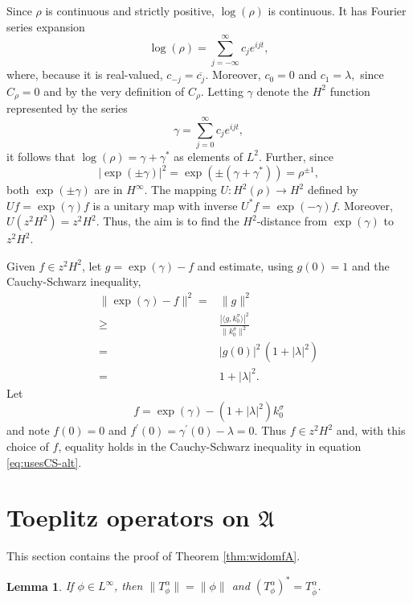 \documentclass[12pt]{amsart}
\newtheorem{lemma}[theorem]{Lemma}
\theoremstyle{definition}
\theoremstyle{remark}
\numberwithin{equation}{section}
\begin{document}
Since ${\rho}$ is continuous and strictly positive, $\log({\rho})$ is continuous. It has Fourier series expansion
\[
 \log({\rho}) = \sum_{j=-\infty}^\infty c_j  e^{ijt},
\]
where, because it is real-valued, $c_{-j}=\overline{c_j}.$ 
Moreover, $c_0=0$
and $c_1=\lambda,$ since ${C_{\rho}}=0$ and by the very definition of ${C_{\rho}}$. Letting ${\gamma}$ denote the $H^2$ function represented
by the series
\[
 {\gamma} = \sum_{j=0}^\infty c_j e^{ijt},
\]
it follows that $\log({\rho}) = {\gamma} +{\gamma}^*$ as elements of $L^2$.
Further, since
\[
 |\exp(\pm {\gamma})|^2 = \exp\left(\pm ({\gamma}+{\gamma}^*)\right) = {\rho}^{\pm 1},
\]
both $\exp(\pm {\gamma})$ are in $H^\infty$.
The mapping $U:H^2(\rho)\to H^2$ defined by $Uf=\exp({\gamma}) f$ is a unitary map
with inverse $U^*f=\exp(-{\gamma}) f$. Moreover, $U(z^2H^2)=z^2 H^2$. 
Thus, the aim is to find the $H^2$-distance from $\exp({\gamma})$ to $z^2H^2$. 

Given $f\in z^2 H^2$, let $g=\exp({\gamma})-f$ and estimate, using $g(0)=1$ and the Cauchy-Schwarz inequality,
\begin{equation}
\label{eq:usesCS-alt}
 \begin{split}
  \|\exp({\gamma})-f\|^2 
     =  & \|g\|^2 \\
      \ge & \frac{ |\langle g, k^{\sigma}_0 \rangle|^2}{ \|k^{\sigma}_0\|^2} \\
   = & |g(0)|^2\, (1+|\lambda|^2) \\
   = & 1+|\lambda|^2.
 \end{split}
\end{equation}
Let 
\[
 f= \exp({\gamma})- (1+|\lambda|^2)k_0^{\sigma}
\]
and note $f(0)=0$ and $f^\prime(0)={\gamma}^\prime(0)-\lambda=0$. Thus $f\in z^2 H^2$ and, with this choice of 
$f$, equality holds in the Cauchy-Schwarz inequality in equation \eqref{eq:usesCS-alt}.

\section{Toeplitz operators on ${\mathfrak{A}}$}
This section contains the proof of Theorem \ref{thm:widomfA}.

\begin{lemma}
\label{lem:norm}
If $\phi\in L^\infty$,  then  $\|T^\alpha_\phi\| =\|\phi\|$ and
$(T^\alpha_\phi)^* = T^\alpha_{\overline{\phi}}$.
\end{lemma}
\end{document}
